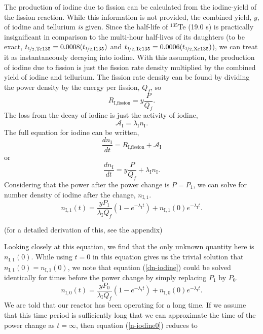 \documentclass{report}
\begin{document}
The production of iodine due to fission can be calculated from the iodine-yield of the fission reaction. While this information is not provided, the combined yield, $y$, of iodine and tellurium \textit{is} given. Since the half-life of $^{135}$Te (19.0 s) is practically insignificant in comparison to the multi-hour half-lives of its daughters (to be exact, $t_{\nicefrac{1}{2},\text{Te135}} = 0.0008(t_{\nicefrac{1}{2},\text{I135}})$ and $t_{\nicefrac{1}{2},\text{Te135}} = 0.0006(t_{\nicefrac{1}{2},\text{Xe135}})$), we can treat it as instantaneously decaying into iodine. With this assumption, the production of iodine due to fission is just the fission rate density multiplied by the combined yield of iodine and tellurium. The fission rate density can be found by dividing the power density by the energy per fission, $Q_f$, so
$$ R_{\text{I,fission}} = y\frac{P}{Q_f} .$$
The loss from the decay of iodine is just the activity of iodine,
$$ \mathcal{A}_{\text{I}} = \lambda_{\text{I}}n_{\text{I}}. $$
The full equation for iodine can be written,
$$ \frac{dn_{\text{I}}}{dt} = R_{\text{I,fission}} + \mathcal{A}_{\text{I}} $$
or 
\begin{equation}
\label{dn-iodine}
\frac{dn_{\text{I}}}{dt} = y\frac{P}{Q_f} + \lambda_{\text{I}}n_{\text{I}} .
\end{equation}
Considering that the power after the power change is $P=P_1$, we can solve for number density of iodine after the change, $n_{\text{I},1}$.
\begin{equation}
\label{n-iodine1}
n_{\text{I},1}(t) = \frac{y P_1}{\lambda_{\text{I}}Q_f}\left(1-e^{-\lambda_{\text{I}}t}\right) + n_{\text{I},1}(0)e^{-\lambda_{\text{I}}t}.
\end{equation}
\begin{center}(for a detailed derivation of this, see the appendix)\end{center}
Looking closely at this equation, we find that the only unknown quantity here is $n_{\text{I},1}(0)$. While using $t=0$ in this equation gives us the trivial solution that $n_{\text{I},1}(0) = n_{\text{I},1}(0)$, we note that equation (\ref{dn-iodine}) could be solved identically for times before the power change by simply replacing $P_1$ by $P_0$. 
\begin{equation}
\label{n-iodine0}
n_{\text{I},0}(t) = \frac{y P_0}{\lambda_{\text{I}}Q_f}\left(1-e^{-\lambda_{\text{I}}t}\right) + n_{\text{I},0}(0)e^{-\lambda_{\text{I}}t}.
\end{equation}
We are told that our reactor has been operating for a long time. If we assume that this time period is sufficiently long that we can approximate the time of the power change as $t=\infty$, then equation (\ref{n-iodine0}) reduces to
\end{document}
